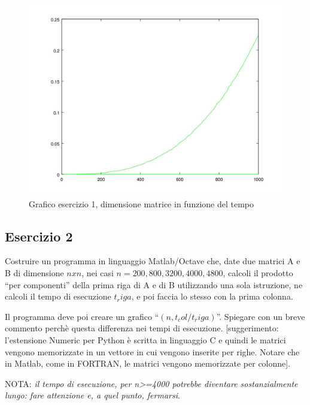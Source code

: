 \begin{figure}[ht!]
\centering
\includegraphics[width=130mm]{../Esercitazione1/images/esercizio1.jpg}
\caption{Grafico esercizio 1, dimensione matrice in funzione del tempo}
\label{overflow}
\end{figure}

\subsection{Esercizio 2}

Costruire un programma in linguaggio Matlab/Octave che, date due matrici A e B di dimensione $n x n$, nei casi $n = 200, 800, 3200, 4000, 4800$, calcoli il prodotto ``per componenti'' della prima riga di A e di B utilizzando una sola istruzione, ne calcoli il tempo di esecuzione $t_riga$, e poi faccia lo stesso con la prima colonna. 

Il programma deve poi creare un grafico ``$(n, t_col / t_riga)$''.  Spiegare con un breve commento perchè questa differenza nei tempi di esecuzione.  [suggerimento: l'estensione Numeric per Python è scritta in linguaggio C e quindi le matrici vengono memorizzate in un vettore in cui vengono inserite per righe.  Notare che in Matlab, come in FORTRAN, le matrici vengono memorizzate per colonne].

NOTA: \textit{il tempo di esecuzione, per n>=4000 potrebbe diventare sostanzialmente lungo: fare attenzione e, a quel punto, fermarsi}.



